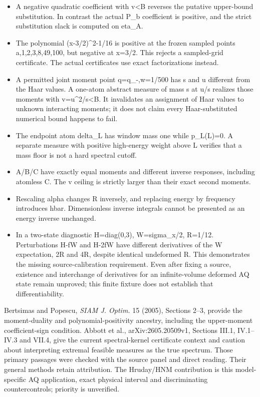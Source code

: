 \begin{itemize}
\tightlist
\item
  A negative quadratic coefficient with v\textless B reverses the putative upper-bound substitution. In contrast the actual P\_b coefficient is positive, and the strict substitution slack is computed on eta\_A.
\item
  The polynomial (x-3/2)\^{}2-1/16 is positive at the frozen sampled points a,1,2,3,8,49,100, but negative at x=3/2. This rejects a sampled-grid certificate. The actual certificates use exact factorizations instead.
\item
  A permitted joint moment point q=q\_-,w=1/500 has s and u different from the Haar values. A one-atom abstract measure of mass s at u/s realizes those moments with v=u\^{}2/s\textless B. It invalidates an assignment of Haar values to unknown interacting moments; it does not claim every Haar-substituted numerical bound happens to fail.
\item
  The endpoint atom delta\_L has window mass one while p\_L(L)=0. A separate measure with positive high-energy weight above L verifies that a mass floor is not a hard spectral cutoff.
\item
  A/B/C have exactly equal moments and different inverse responses, including atomless C. The v ceiling is strictly larger than their exact second moments.
\item
  Rescaling alpha changes R inversely, and replacing energy by frequency introduces hbar. Dimensionless inverse integrals cannot be presented as an energy inverse unchanged.
\item
  In a two-state diagnostic H=diag(0,3), W=sigma\_x/2, R=1/12. Perturbations H-fW and H-2fW have different derivatives of the W expectation, 2R and 4R, despite identical undeformed R. This demonstrates the missing source-calibration requirement. Even after fixing a source, existence and interchange of derivatives for an infinite-volume deformed AQ state remain unproved; this finite fixture does not establish that differentiability.
\end{itemize}

Bertsimas and Popescu, \emph{SIAM J. Optim.} 15 (2005), Sections 2--3, provide the moment-duality and polynomial-positivity ancestry, including the upper-moment coefficient-sign condition. Abbott et al., arXiv:2605.20509v1, Sections III.1, IV.1--IV.3 and VII.4, give the current spectral-kernel certificate context and caution about interpreting extremal feasible measures as the true spectrum. Those primary passages were checked with the source panel and direct reading. Their general methods retain attribution. The Hruday/HNM contribution is this model-specific AQ application, exact physical interval and discriminating countercontrols; priority is unverified.

